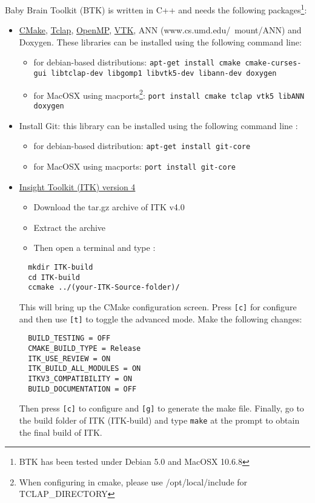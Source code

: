 \documentclass[a4paper,10pt]{article}
\begin{document}
  Baby Brain Toolkit (BTK) is written in C++ and needs the following packages\footnote{BTK has been tested under Debian 5.0 and MacOSX 10.6.8}:
  \begin{itemize}
  \item \href{http://www.cmake.org}{CMake}, \href{http://tclap.sourceforge.net}{Tclap}, \href{http://openmp.org}{OpenMP}, \href{http://www.vtk.org}{VTK}, ANN (www.cs.umd.edu/\string~mount/ANN) and Doxygen. These
  libraries can be installed using the following command line: 
  \begin{itemize}
  \item for debian-based distributions: \texttt{apt-get install cmake
  cmake-curses-gui libtclap-dev libgomp1 libvtk5-dev libann-dev doxygen}
  \item for MacOSX using macports\footnote{When configuring in cmake, please use /opt/local/include for TCLAP\_DIRECTORY}: \texttt{port install cmake tclap vtk5 libANN doxygen}
  \end{itemize}
  \item Install Git: this library can be installed using the following command line : 
  \begin{itemize}
  \item for debian-based distribution: \texttt{apt-get install git-core}
  \item for MacOSX using macports: \texttt{port install git-core}
  \end{itemize}
  \item \href{http://www.itk.org/ITK/resources/software.html}{Insight Toolkit (ITK) version 4}
  \begin{itemize}
  \item Download the tar.gz archive of ITK v4.0
  \item Extract the archive 
  \item Then open a terminal and type :
  \end{itemize}
  \begin{verbatim}
  mkdir ITK-build
  cd ITK-build
  ccmake ../(your-ITK-Source-folder)/
  \end{verbatim}
  This will bring up the CMake configuration screen. Press \texttt{[c]} for
  configure and then use \texttt{[t]} to toggle the advanced mode. Make the
  following changes:
  \begin{verbatim}
  BUILD_TESTING = OFF
  CMAKE_BUILD_TYPE = Release
  ITK_USE_REVIEW = ON
  ITK_BUILD_ALL_MODULES = ON
  ITKV3_COMPATIBILITY = ON
  BUILD_DOCUMENTATION = OFF
  \end{verbatim}
  Then press \texttt{[c]} to configure and \texttt{[g]} to generate the make file.
  Finally, go to the build folder of ITK (ITK-build) and type \texttt{make} at the prompt to obtain the final build of ITK.

  \end{itemize}
\end{document}
